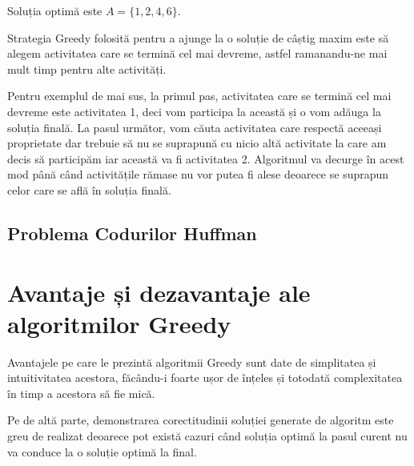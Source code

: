 \par
Soluția optimă este $A = \{1, 2, 4, 6  \} $.
\par 
Strategia Greedy folosită pentru a ajunge la o soluție de câștig maxim este să alegem activitatea care se termină cel mai devreme, astfel ramanandu-ne mai mult timp pentru alte activități. \par 
Pentru exemplul de mai sus, la primul pas,  activitatea care se termină cel mai devreme este activitatea 1, deci vom participa la această și o vom adăuga la soluția finală.  La pasul următor, vom căuta activitatea care respectă aceeași proprietate dar trebuie să nu se suprapună cu nicio altă activitate la care am decis să participăm iar această va fi activitatea 2. Algoritmul va decurge în acest mod până când activitățile rămase nu vor putea fi alese deoarece se suprapun celor care se află în soluția finală.

\subsection{Problema Codurilor Huffman}

\section{Avantaje și dezavantaje ale algoritmilor Greedy}				
Avantajele pe care le prezintă algoritmii Greedy sunt date de simplitatea și intuitivitatea acestora, făcându-i foarte ușor de înțeles și totodată complexitatea în timp a acestora să fie mică. \par
Pe de altă parte, demonstrarea corectitudinii soluției generate de algoritm este greu de realizat deoarece pot există cazuri când soluția optimă la pasul curent nu va conduce la o soluție optimă la final.



